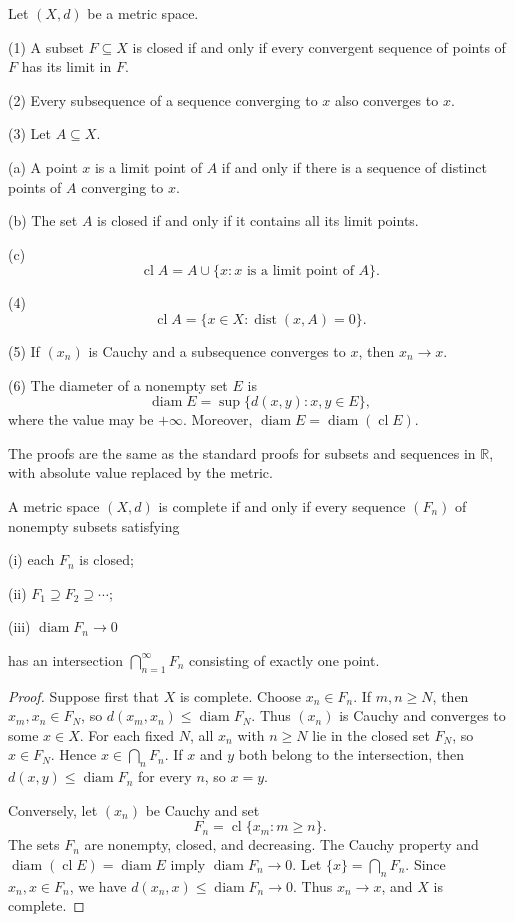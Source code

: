 \begin{thm}
Let $(X,d)$ be a metric space.

(1) A subset $F\subseteq X$ is closed if and only if every convergent sequence
of points of $F$ has its limit in $F$.

(2) Every subsequence of a sequence converging to $x$ also converges to $x$.

(3) Let $A\subseteq X$.

(a) A point $x$ is a limit point of $A$ if and only if there is a sequence of
distinct points of $A$ converging to $x$.

(b) The set $A$ is closed if and only if it contains all its limit points.

(c)
\[
\operatorname{cl}A=A\cup\{x:x\text{ is a limit point of }A\}.
\]

(4)
\[
\operatorname{cl}A=\{x\in X:\operatorname{dist}(x,A)=0\}.
\]

(5) If $(x_n)$ is Cauchy and a subsequence converges to $x$, then $x_n\to x$.

(6) The diameter of a nonempty set $E$ is
\[
\operatorname{diam}E=\sup\{d(x,y):x,y\in E\},
\]
where the value may be $+\infty$. Moreover,
$\operatorname{diam}E=\operatorname{diam}(\operatorname{cl}E)$.
\end{thm}

The proofs are the same as the standard proofs for subsets and sequences in
$\mathbb{R}$, with absolute value replaced by the metric.

\begin{thm}
A metric space $(X,d)$ is complete if and only if every sequence $(F_n)$ of
nonempty subsets satisfying

(i) each $F_n$ is closed;

(ii) $F_1\supseteq F_2\supseteq\cdots$;

(iii) $\operatorname{diam}F_n\to0$

has an intersection $\bigcap_{n=1}^\infty F_n$ consisting of exactly one
point.
\end{thm}

\begin{proof}
Suppose first that $X$ is complete. Choose $x_n\in F_n$. If $m,n\geq N$, then
$x_m,x_n\in F_N$, so
$d(x_m,x_n)\leq\operatorname{diam}F_N$. Thus $(x_n)$ is Cauchy and converges
to some $x\in X$. For each fixed $N$, all $x_n$ with $n\geq N$ lie in the
closed set $F_N$, so $x\in F_N$. Hence $x\in\bigcap_nF_n$. If $x$ and $y$
both belong to the intersection, then
$d(x,y)\leq\operatorname{diam}F_n$ for every $n$, so $x=y$.

Conversely, let $(x_n)$ be Cauchy and set
\[
F_n=\operatorname{cl}\{x_m:m\geq n\}.
\]
The sets $F_n$ are nonempty, closed, and decreasing. The Cauchy property and
$\operatorname{diam}(\operatorname{cl}E)=\operatorname{diam}E$ imply
$\operatorname{diam}F_n\to0$. Let $\{x\}=\bigcap_nF_n$. Since
$x_n,x\in F_n$, we have
$d(x_n,x)\leq\operatorname{diam}F_n\to0$. Thus $x_n\to x$, and $X$ is
complete.
\end{proof}

